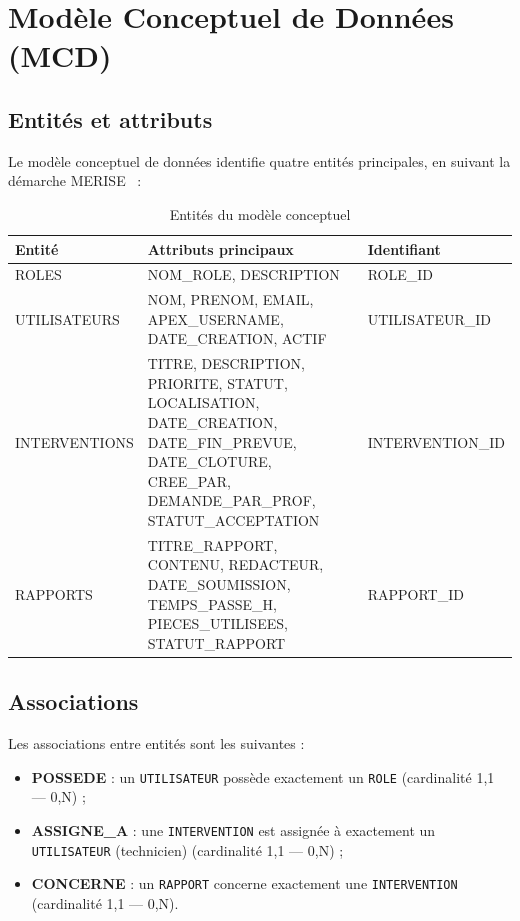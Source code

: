 \documentclass[12pt,a4paper,oneside]{report}
\begin{document}
\section{Modèle Conceptuel de Données (MCD)}

\subsection{Entités et attributs}

Le modèle conceptuel de données identifie quatre entités principales, en suivant la démarche MERISE~\cite{merise} :

\begin{table}[H]
  \centering
  \caption{Entités du modèle conceptuel}
  \begin{tabularx}{\linewidth}{@{}l X X@{}}
    \toprule
    \textbf{Entité} & \textbf{Attributs principaux} & \textbf{Identifiant} \\
    \midrule
    ROLES & NOM\_ROLE, DESCRIPTION & ROLE\_ID \\
    UTILISATEURS & NOM, PRENOM, EMAIL, APEX\_USERNAME, DATE\_CREATION, ACTIF & UTILISATEUR\_ID \\
    INTERVENTIONS & TITRE, DESCRIPTION, PRIORITE, STATUT, LOCALISATION, DATE\_CREATION, DATE\_FIN\_PREVUE, DATE\_CLOTURE, CREE\_PAR, DEMANDE\_PAR\_PROF, STATUT\_ACCEPTATION & INTERVENTION\_ID \\
    RAPPORTS & TITRE\_RAPPORT, CONTENU, REDACTEUR, DATE\_SOUMISSION, TEMPS\_PASSE\_H, PIECES\_UTILISEES, STATUT\_RAPPORT & RAPPORT\_ID \\
    \bottomrule
  \end{tabularx}
  \label{tab:entites}
\end{table}

\subsection{Associations}

Les associations entre entités sont les suivantes :

\begin{itemize}[leftmargin=2em]
  \item \textbf{POSSEDE} : un \texttt{UTILISATEUR} possède exactement un \texttt{ROLE} (cardinalité 1,1 — 0,N) ;
  \item \textbf{ASSIGNE\_A} : une \texttt{INTERVENTION} est assignée à exactement un \texttt{UTILISATEUR} (technicien) (cardinalité 1,1 — 0,N) ;
  \item \textbf{CONCERNE} : un \texttt{RAPPORT} concerne exactement une \texttt{INTERVENTION} (cardinalité 1,1 — 0,N).
\end{itemize}
\end{document}
